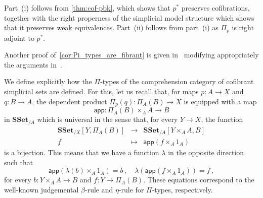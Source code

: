 \documentclass[reqno,10pt,a4paper,oneside,draft]{amsart}
\makeatletter
\renewenvironment{proof}[1][\proofname] {\par\pushQED{\qed}\normalfont\topsep6\p@\@plus6\p@\relax\trivlist\item[\hskip\labelsep\bf#1\@addpunct{.}]\ignorespaces}{\popQED\endtrivlist\@endpefalse}
\numberwithin{equation}{section}
\theoremstyle{mythm}
\theoremstyle{mydef}
\theoremstyle{myrmk}
\newcommand{\co}{\colon}
\newcommand{\SSet}{\mathbf{SSet}}
\makeatother
\begin{document}
\begin{proof} Part~(i) follows from \cref{thm:cof-pbk}, which shows that $p^*$ preserves cofibrations, together with the right properness of the simplicial model structure which shows that it preserves weak equivalences.
 Part~(ii) follows from part~(i) as $\Pi_p$ is right adjoint to $p^*$.
\end{proof}


Another proof of~\cref{cor:Pi_types_are_fibrant} is given in~\cite[Section~4]{GambinoN:anocp} modifying appropriately the arguments in~\cite{gambino2017frobenius}.


 
\begin{remark}  \label{rem:pi-types}
We define explicitly how the $\Pi$-types of the comprehension category of cofibrant simplicial sets are defined. For this, let us recall that, for maps $p \co A \to X$ and $q \co B \to A$,  the dependent product $\Pi_p(q) \co \Pi_A(B)
\to X$ is equipped with a map
\[
\mathsf{app} \co \Pi_A(B) \times_A  A \to B
\] 
in $\SSet_{/A}$ which is universal in the sense that, for every  $Y \to X$, the function
\[
\begin{array}{rcl} 
 \SSet_{/X}[ Y , \Pi_A(B)] & \longrightarrow &  \SSet_{/A}[Y \times_A A, B]  \\
  f & \longmapsto & \mathsf{app}(f \times_A 1_A) 
  \end{array} 
 \]
 is a bijection. This means that we have a function $\lambda$ in the opposite direction such that  
 \begin{equation}
 \label{equ:betaeta}
 \mathsf{app}(\lambda(b) \times_A 1_A) = b   \, , \quad
 \lambda( \mathsf{app}(f \times_A 1_A)) = f \, ,
 \end{equation}
 for every $b \co Y \times_A A \to B$ and $f \co Y \to \Pi_A(B)$.  These equations correspond to the
 well-known judgemental $\beta$-rule and $\eta$-rule for $\Pi$-types, respectively.
 

\end{remark}
\end{document}
